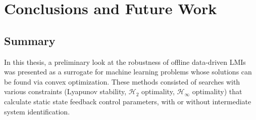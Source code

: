 \chapter{Conclusions and Future Work}
\label{chap:conclusion}
\section{Summary}
In this thesis, a preliminary look at the robustness of offline data-driven LMIs was presented as a surrogate for machine learning problems whose solutions can be found via convex optimization.  These methods consisted of searches with various constraints (Lyapunov stability, $\mathcal{H}_{2}$ optimality, $\mathcal{H}_{\infty}$ optimality) that calculate static state feedback control parameters, with or without intermediate system identification.

